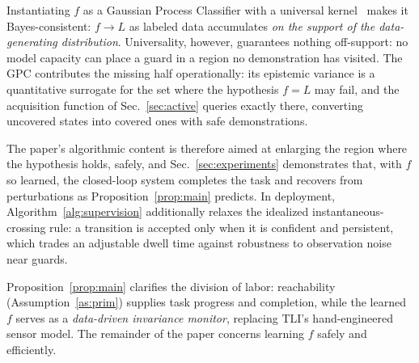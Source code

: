 \begin{remark}
\label{rem:consistency}
Instantiating $f$ as a Gaussian Process Classifier with a universal kernel~\cite{steinwart2001influence} makes it Bayes-consistent: $f\to L$ as labeled data accumulates \emph{on the support of the data-generating distribution}. Universality, however, guarantees nothing off-support: no model capacity can place a guard in a region no demonstration has visited. The GPC contributes the missing half operationally: its epistemic variance is a quantitative surrogate for the set where the hypothesis $f=L$ may fail, and the acquisition function of Sec.~\ref{sec:active} queries exactly there, converting uncovered states into covered ones with safe demonstrations.
\end{remark} The paper's algorithmic content is therefore aimed at enlarging the region where the hypothesis holds, safely, and Sec.~\ref{sec:experiments} demonstrates that, with $f$ so learned, the closed-loop system completes the task and recovers from perturbations as Proposition~\ref{prop:main} predicts. In deployment, Algorithm~\ref{alg:supervision} additionally relaxes the idealized instantaneous-crossing rule: a transition is accepted only when it is confident and persistent, which trades an adjustable dwell time against robustness to observation noise near guards.

Proposition~\ref{prop:main} clarifies the division of labor: reachability (Assumption~\ref{as:prim}) supplies task progress and completion, while the learned $f$ serves as a \emph{data-driven invariance monitor}, replacing TLI's hand-engineered sensor model. The remainder of the paper concerns learning $f$ safely and efficiently.

